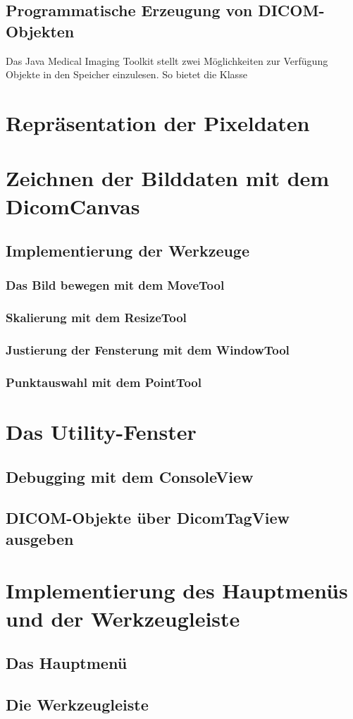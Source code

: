 \subsection{Programmatische Erzeugung von DICOM-Objekten}

Das Java Medical Imaging Toolkit stellt zwei Möglichkeiten zur Verfügung Objekte in den Speicher einzulesen. So bietet die Klasse

\section{Repräsentation der Pixeldaten}

\section{Zeichnen der Bilddaten mit dem DicomCanvas}

\subsection{Implementierung der Werkzeuge}

\subsubsection{Das Bild bewegen mit dem MoveTool}

\subsubsection{Skalierung mit dem ResizeTool}

\subsubsection{Justierung der Fensterung mit dem WindowTool}

\subsubsection{Punktauswahl mit dem PointTool}

\section{Das Utility-Fenster}

\subsection{Debugging mit dem ConsoleView}

\subsection{DICOM-Objekte über DicomTagView ausgeben}

\section{Implementierung des Hauptmenüs und der Werkzeugleiste}

\subsection{Das Hauptmenü}

\subsection{Die Werkzeugleiste}



